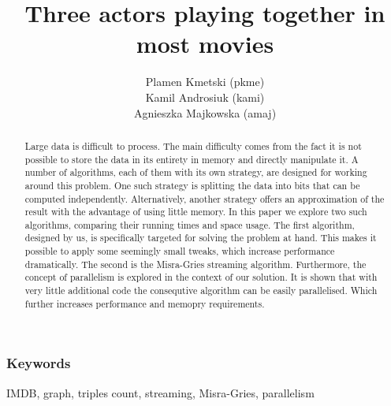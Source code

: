 \documentclass[11pt]{article} %
\title{Three actors playing together in most movies}
\author{Plamen Kmetski (pkme)\\Kamil Androsiuk (kami)\\Agnieszka Majkowska (amaj)}
\begin{document}
\maketitle

\begin{abstract}

Large data is difficult to process. The main difficulty comes from the fact it is not possible to store the data in its entirety in memory and directly manipulate it. A number of algorithms, each of them with its own strategy, are designed for working around this problem. One such strategy is splitting the data into bits that can be computed independently. Alternatively, another strategy offers an approximation of the result with the advantage of using little memory. In this paper we explore two such algorithms, comparing their running times and space usage. The first algorithm, designed by us, is specifically targeted for solving the problem at hand. This makes it possible to apply some seemingly small tweaks, which increase performance dramatically. The second is the Misra-Gries streaming algorithm. Furthermore, the concept of parallelism is explored in the context of our solution. It is shown that with very little additional code the consequtive algorithm can be easily parallelised. Which further increases performance and memopry requirements.

\end{abstract}

\subsubsection*{Keywords}
\label{Keywords}
IMDB, graph, triples count, streaming, Misra-Gries, parallelism








\end{document}
